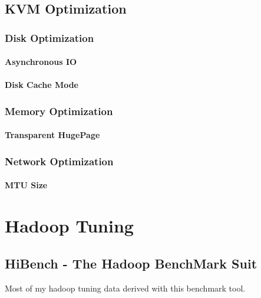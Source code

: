 \documentclass[letterpaper,10pt,english]{sphinxmanual}
\begin{document}
\section{KVM Optimization}
\label{docs/kvm_optimization/index:kvm-optimization}\label{docs/kvm_optimization/index::doc}

\subsection{Disk Optimization}
\label{docs/kvm_optimization/index:disk-optimization}

\subsubsection{Asynchronous IO}
\label{docs/kvm_optimization/index:asynchronous-io}

\subsubsection{Disk Cache Mode}
\label{docs/kvm_optimization/index:disk-cache-mode}

\subsection{Memory Optimization}
\label{docs/kvm_optimization/index:memory-optimization}

\subsubsection{Transparent HugePage}
\label{docs/kvm_optimization/index:transparent-hugepage}

\subsection{Network Optimization}
\label{docs/kvm_optimization/index:network-optimization}

\subsubsection{MTU Size}
\label{docs/kvm_optimization/index:mtu-size}

\chapter{Hadoop Tuning}
\label{index:hadoop-tuning}

\section{HiBench - The Hadoop BenchMark Suit}
\label{docs/hibench_intro/index:hibench-the-hadoop-benchmark-suit}\label{docs/hibench_intro/index::doc}
Most of my hadoop tuning data derived with this benchmark tool.
\end{document}
